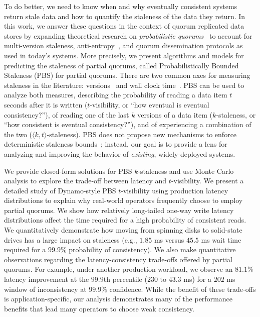 \documentclass{vldb}
\begin{document}
To do better, we need to know when and why eventually consistent
systems return stale data and how to quantify the staleness of the
data they return.  In this work, we answer these questions in the
context of quorum replicated data stores by expanding theoretical
research on \textit{probabilistic quorums}~\cite{prob-quorum,
  quorum-overview} to account for multi-version staleness,
anti-entropy~\cite{antientropy}, and quorum dissemination protocols as
used in today's systems.  More precisely, we present algorithms and
models for predicting the staleness of partial quorums, called
Probabilistically Bounded Staleness (PBS) for partial quorums. There
are two common axes for measuring staleness in the literature:
versions~\cite{aqua, frac} and wall clock time~\cite{vahdat-article,
  vahdat-bounded}.  PBS can be used to analyze both measures,
describing the probability of reading a data item $t$ seconds after it is
written ($t$-visibility, or ``how eventual is eventual
consistency?''), of reading one of the last $k$ versions of
a data item ($k$-staleness, or ``how consistent is eventual
consistency?''), and of experiencing a combination of the two
($\langle k, t \rangle$-staleness). PBS does not propose new
mechanisms to enforce deterministic staleness bounds~\cite{ aqua,
  trapp,vahdat-article, vahdat-bounded, frac}; instead, our goal is to
provide a lens for analyzing and improving the behavior of
\textit{existing}, widely-deployed systems.

We provide closed-form solutions for PBS $k$-staleness and use Monte
Carlo analysis to explore the trade-off between latency and
$t$-visibility.  We present a detailed study of Dynamo-style PBS
$t$-visibility using production latency distributions to explain why
real-world operators frequently choose to employ partial quorums. We
show how relatively long-tailed one-way write latency distributions
affect the time required for a high probability of consistent reads.
We quantitatively demonstrate how moving from spinning disks to
solid-state drives has a large impact on staleness (e.g., $1.85$ ms
versus $45.5$ ms wait time required for a $99.9$\% probability of
consistency).  We also make quantitative observations regarding the
latency-consistency trade-offs offered by partial quorums.  For
example, under another production workload, we observe an $81.1\%$
latency improvement at the $99.9$th percentile ($230$ to $43.3$ ms)
for a $202$ ms window of inconsistency at $99.9\%$ confidence.  While
the benefit of these trade-offs is application-specific, our analysis
demonstrates many of the performance benefits that lead many operators to choose weak
consistency.
\end{document}
